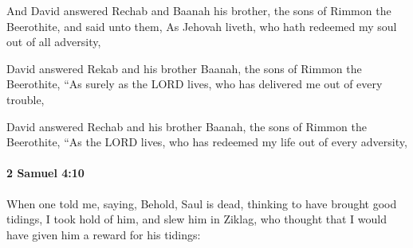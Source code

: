 			\begin{versebox}
					\item[BHS] 
					\item[ASV] And David answered Rechab and Baanah his brother, the sons of Rimmon the Beerothite, and said unto them, As Jehovah liveth, who hath redeemed my soul out of all adversity,
					\item[NIV] David answered Rekab and his brother Baanah, the sons of Rimmon the Beerothite, “As surely as the LORD lives, who has delivered me out of every trouble,
					\item[NRSV] David answered Rechab and his brother Baanah, the sons of Rimmon the Beerothite, “As the LORD lives, who has redeemed my life out of every adversity,
			\end{versebox}

		\paragraph{2 Samuel 4:10} %
			\label{2SAMUEL-4-10}

			When one told me, saying, Behold, Saul is dead, thinking to have brought good tidings, I took hold of him, and slew him in Ziklag, who thought that I would have given him a reward for his tidings:


